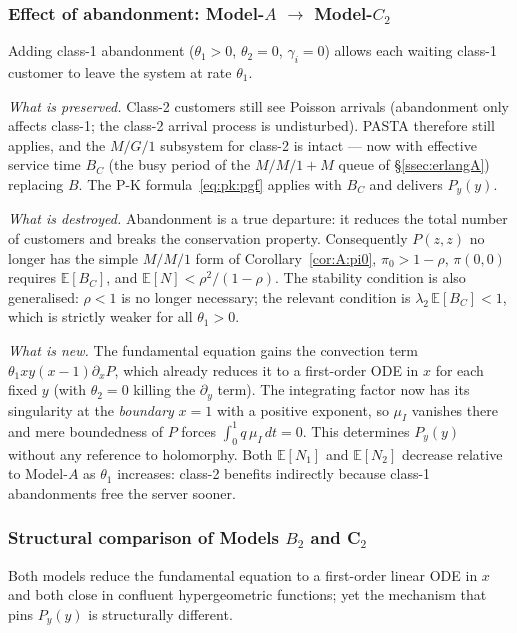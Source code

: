 \subsubsection*{Effect of abandonment: Model-\texorpdfstring{$A$}{A} \texorpdfstring{$\to$}{->} Model-\texorpdfstring{$C_2$}{C2}}

Adding class-1 abandonment ($\theta_1>0$, $\theta_2=0$, $\gamma_i=0$)
allows each waiting class-1 customer to leave the system at rate $\theta_1$.

\emph{What is preserved.}
Class-2 customers still see Poisson arrivals (abandonment only affects
class-1; the class-2 arrival process is undisturbed).
PASTA therefore still applies, and the $M/G/1$ subsystem for class-2 is
intact --- now with effective service time $B_C$ (the busy period of the
$M/M/1+M$ queue of \S\ref{ssec:erlangA}) replacing $B$.
The P-K formula~\eqref{eq:pk:pgf} applies with $B_C$ and delivers $P_y(y)$.

\emph{What is destroyed.}
Abandonment is a true departure: it reduces the total number of customers and
breaks the conservation property.  Consequently $P(z,z)$ no longer has the
simple $M/M/1$ form of Corollary~\ref{cor:A:pi0}, $\pi_0>1-\rho$, $\pi(0,0)$ requires
$\mathbb{E}[B_C]$, and $\mathbb{E}[N]<\rho^2/(1-\rho)$.  The stability
condition is also generalised: $\rho<1$ is no longer necessary; the relevant
condition is $\lambda_2\,\mathbb{E}[B_C]<1$, which is strictly weaker for all
$\theta_1>0$.

\emph{What is new.}
The fundamental equation gains the convection term
$\theta_1 xy(x-1)\partial_x P$, which already reduces it to a first-order ODE
in $x$ for each fixed $y$ (with $\theta_2=0$ killing the $\partial_y$ term).
The integrating factor now has its singularity at the \emph{boundary} $x=1$
with a positive exponent, so $\mu_I$ vanishes there and mere boundedness of
$P$ forces $\int_0^1 q\,\mu_I\,dt=0$.  This determines $P_y(y)$ without any
reference to holomorphy.  Both $\mathbb{E}[N_1]$ and $\mathbb{E}[N_2]$ decrease
relative to Model-$A$ as $\theta_1$ increases: class-2 benefits indirectly
because class-1 abandonments free the server sooner.

\subsubsection*{Structural comparison of Models \texorpdfstring{$B_2$}{B2} and C\texorpdfstring{$_2$}{2}}

Both models reduce the fundamental equation to a first-order linear ODE in $x$
and both close in confluent hypergeometric functions; yet the mechanism that
pins $P_y(y)$ is structurally different.

